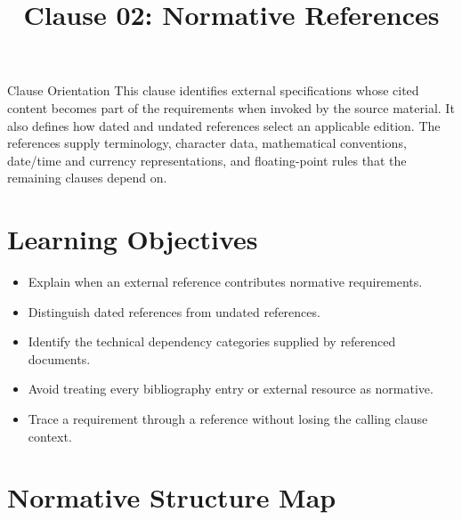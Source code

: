 \documentclass[10pt,letterpaper]{article}
\title{Clause 02: Normative References}
\author{}
\date{}
\begin{document}
\maketitle



\begin{CornellOverviewBox}{Clause Orientation}
This clause identifies external specifications whose cited content becomes part of the requirements when invoked by the source material. It also defines how dated and undated references select an applicable edition. The references supply terminology, character data, mathematical conventions, date/time and currency representations, and floating-point rules that the remaining clauses depend on.
\end{CornellOverviewBox}

\section{Learning Objectives}
\begin{itemize}
  \item Explain when an external reference contributes normative requirements.
  \item Distinguish dated references from undated references.
  \item Identify the technical dependency categories supplied by referenced documents.
  \item Avoid treating every bibliography entry or external resource as normative.
  \item Trace a requirement through a reference without losing the calling clause context.
\end{itemize}

\section{Normative Structure Map}
\begin{CornellNotesTable}
\end{CornellNotesTable}
\end{document}
